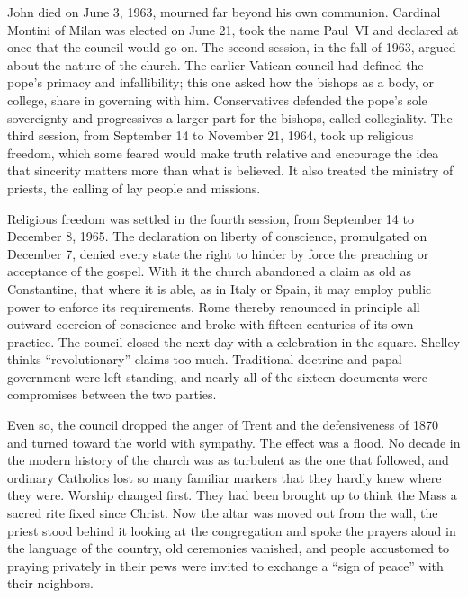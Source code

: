 John died on June 3, 1963, mourned far beyond his own communion. Cardinal Montini of Milan was
elected on June 21, took the name Paul~VI and declared at once that the council would go on. The
second session, in the fall of 1963, argued about the nature of the church. The earlier Vatican
council had defined the pope's primacy and infallibility; this one asked how the bishops as a body,
or college, share in governing with him. Conservatives defended the pope's sole sovereignty and
progressives a larger part for the bishops, called collegiality. The third session, from September
14 to November 21, 1964, took up religious freedom, which some feared would make truth relative and
encourage the idea that sincerity matters more than what is believed. It also treated the ministry of
priests, the calling of lay people and missions.

Religious freedom was settled in the fourth session, from September 14 to December 8, 1965. The
declaration on liberty of conscience, promulgated on December 7, denied every state the right to
hinder by force the preaching or acceptance of the gospel. With it the church abandoned a claim as
old as Constantine, that where it is able, as in Italy or Spain, it may employ public power to
enforce its requirements. Rome thereby renounced in principle all outward coercion of conscience and
broke with fifteen centuries of its own practice. The council closed the next day with a celebration
in the square. Shelley thinks ``revolutionary'' claims too much. Traditional doctrine and papal
government were left standing, and nearly all of the sixteen documents were compromises between the
two parties.

Even so, the council dropped the anger of Trent and the defensiveness of 1870 and turned toward the
world with sympathy. The effect was a flood. No decade in the modern history of the church was as
turbulent as the one that followed, and ordinary Catholics lost so many familiar markers that they
hardly knew where they were. Worship changed first. They had been brought up to think the Mass a
sacred rite fixed since Christ. Now the altar was moved out from the wall, the priest stood behind
it looking at the congregation and spoke the prayers aloud in the language of the country, old
ceremonies vanished, and people accustomed to praying privately in their pews were invited to
exchange a ``sign of peace'' with their neighbors.

